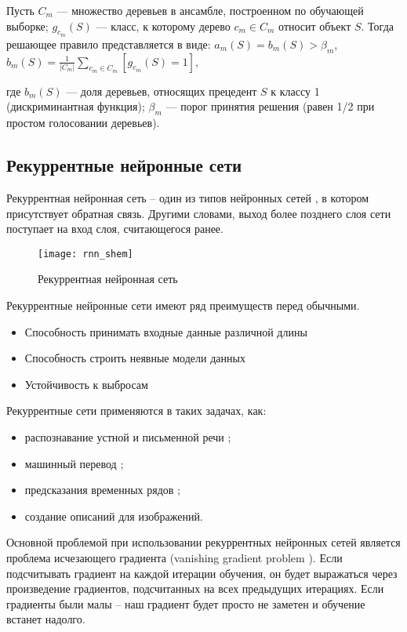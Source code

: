 Пусть $C_m$ — множество деревьев в ансамбле, построенном по обучающей выборке; $g_{c_m}(S)$ — класс, к которому дерево $c_m \in C_m$ относит объект $S$. Тогда решающее правило представляется в виде:
$a_m(S) = b_m(S) > \beta_m$, $b_m(S) = \frac{1}{|C_m|}\sum_{c_m \in C_m}[g_{c_m}(S) = 1]$,

где $b_m(S)$ — доля деревьев, относящих прецедент $S$ к классу 1 (дискриминантная функция); $\beta_m$ — порог принятия решения (равен 1/2 при простом голосовании деревьев).

\subsection{Рекуррентные нейронные сети}
Рекуррентная нейронная сеть – один из типов нейронных сетей \cite{neural_network}, в котором присутствует обратная связь. Другими словами, выход более позднего слоя сети поступает на вход слоя, считающегося ранее.
\begin{figure}[h]
	\begin{center}
		\texttt{[image: rnn\_shem]}
		\caption{Рекуррентная нейронная сеть}
		\label{ris:rnn_shem}
	\end{center}
\end{figure}


Рекуррентные нейронные сети имеют ряд преимуществ перед обычными.
\begin{itemize}
	\item Способность принимать входные данные различной длины
	\item Способность строить неявные модели данных
	\item Устойчивость к выбросам
\end{itemize}

Рекуррентные сети применяются в таких задачах, как:
\begin{itemize}
	\item распознавание устной и письменной речи \cite{rnn_for_speech_recognition, rnn_for_text_recognition};
	\item машинный перевод \cite{rnn_for_translation};
	\item предсказания временных рядов \cite{rnn_for_prediction};
	\item создание описаний для изображений.
\end{itemize}

Основной проблемой при использовании рекуррентных нейронных сетей является проблема исчезающего градиента (vanishing gradient problem \cite{vanishing_gradient_problem}). Если подсчитывать градиент на каждой итерации обучения, он будет выражаться через произведение градиентов, подсчитанных на всех предыдущих итерациях. Если градиенты были малы – наш градиент будет просто не заметен и обучение встанет надолго. 

